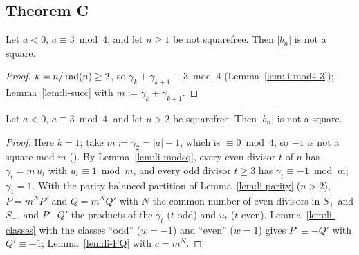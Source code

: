 \subsection*{Theorem C}

\begin{lemma}
  \label{lem:li-C-nonsqfree}
  \leanok
  Let $a < 0$, $a \equiv 3 \bmod 4$, and let $n \ge 1$ be not squarefree. Then $|b_n|$ is not a
  square.
\end{lemma}
\begin{proof}
  \leanok
  $k = n/\operatorname{rad}(n) \ge 2$, so $\gamma_k + \gamma_{k+1} \equiv 3 \bmod 4$ (Lemma~\ref{lem:li-mod4-3});
  Lemma~\ref{lem:li-succ} with $m := \gamma_k + \gamma_{k+1}$.
\end{proof}

\begin{lemma}
  \label{lem:li-C-sqfree}
  \leanok
  Let $a < 0$, $a \equiv 3 \bmod 4$, and let $n > 2$ be squarefree. Then $|b_n|$ is not a square.
\end{lemma}
\begin{proof}
  \leanok
  Here $k = 1$; take $m := \gamma_2 = |a| - 1$, which is $\equiv 0 \bmod 4$, so $-1$ is not a
  square mod $m$ (). By
  Lemma~\ref{lem:li-modsq}, every even divisor $t$ of $n$ has $\gamma_t = m\,u_t$ with
  $u_t \equiv 1 \bmod m$, and every odd divisor $t \ge 3$ has $\gamma_t \equiv -1 \bmod m$;
  $\gamma_1 = 1$. With the parity-balanced partition of Lemma~\ref{lem:li-parity} ($n > 2$),
  $P = m^N P'$ and $Q = m^N Q'$ with $N$ the common number of even divisors in $S_+$ and $S_-$,
  and $P'$, $Q'$ the products of the $\gamma_t$ ($t$ odd) and $u_t$ ($t$ even).
  Lemma~\ref{lem:li-classes} with the classes ``odd'' ($w = -1$) and ``even'' ($w = 1$) gives
  $P' \equiv -Q'$ with $Q' \equiv \pm 1$; Lemma~\ref{lem:li-PQ} with $c = m^N$.
\end{proof}
